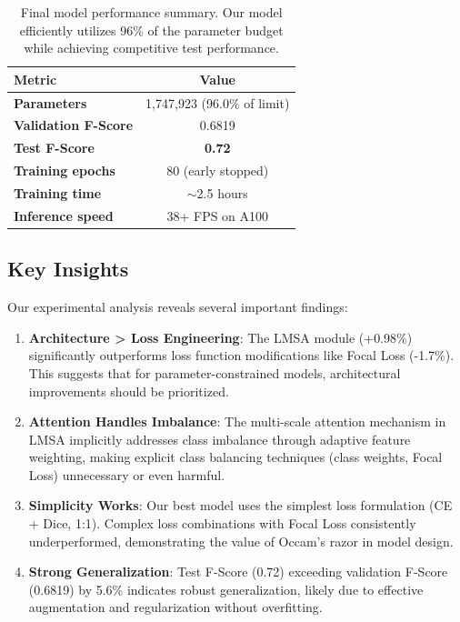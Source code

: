\begin{table}[h]
\centering
\small
\begin{tabular}{lc}
\hline
Metric & Value \\
\hline
\textbf{Parameters} & 1,747,923 (96.0\% of limit) \\
\textbf{Validation F-Score} & 0.6819 \\
\textbf{Test F-Score} & \textbf{0.72} \\
\textbf{Training epochs} & 80 (early stopped) \\
\textbf{Training time} & $\sim$2.5 hours \\
\textbf{Inference speed} & 38+ FPS on A100 \\
\hline
\end{tabular}
\caption{Final model performance summary. Our model efficiently utilizes 96\% of the parameter budget while achieving competitive test performance.}
\end{table}

\subsection{Key Insights}

Our experimental analysis reveals several important findings:

\begin{enumerate}
    \item \textbf{Architecture > Loss Engineering}: The LMSA module (+0.98\%) significantly outperforms loss function modifications like Focal Loss (-1.7\%). This suggests that for parameter-constrained models, architectural improvements should be prioritized.

    \item \textbf{Attention Handles Imbalance}: The multi-scale attention mechanism in LMSA implicitly addresses class imbalance through adaptive feature weighting, making explicit class balancing techniques (class weights, Focal Loss) unnecessary or even harmful.

    \item \textbf{Simplicity Works}: Our best model uses the simplest loss formulation (CE + Dice, 1:1). Complex loss combinations with Focal Loss consistently underperformed, demonstrating the value of Occam's razor in model design.

    \item \textbf{Strong Generalization}: Test F-Score (0.72) exceeding validation F-Score (0.6819) by 5.6\% indicates robust generalization, likely due to effective augmentation and regularization without overfitting.
\end{enumerate}
